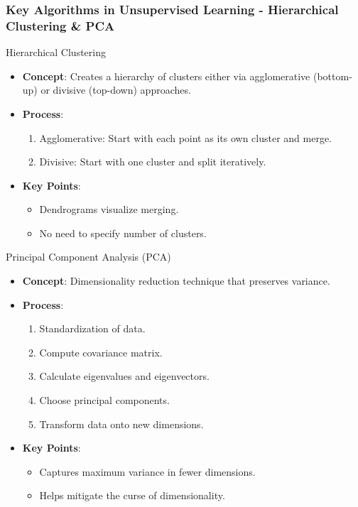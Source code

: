 \documentclass{beamer}
\begin{document}
\begin{frame}[fragile]
    \frametitle{Key Algorithms in Unsupervised Learning - Hierarchical Clustering \& PCA}
    \begin{block}{Hierarchical Clustering}
        \begin{itemize}
            \item \textbf{Concept}: Creates a hierarchy of clusters either via agglomerative (bottom-up) or divisive (top-down) approaches.
            \item \textbf{Process}:
                \begin{enumerate}
                    \item Agglomerative: Start with each point as its own cluster and merge.
                    \item Divisive: Start with one cluster and split iteratively.
                \end{enumerate}
            \item \textbf{Key Points}:
                \begin{itemize}
                    \item Dendrograms visualize merging.
                    \item No need to specify number of clusters.
                \end{itemize}
        \end{itemize}
    \end{block}

    \begin{block}{Principal Component Analysis (PCA)}
        \begin{itemize}
            \item \textbf{Concept}: Dimensionality reduction technique that preserves variance.
            \item \textbf{Process}:
                \begin{enumerate}
                    \item Standardization of data.
                    \item Compute covariance matrix.
                    \item Calculate eigenvalues and eigenvectors.
                    \item Choose principal components.
                    \item Transform data onto new dimensions.
                \end{enumerate}
            \item \textbf{Key Points}:
                \begin{itemize}
                    \item Captures maximum variance in fewer dimensions.
                    \item Helps mitigate the curse of dimensionality.
                \end{itemize}
        \end{itemize}
    \end{block}
\end{frame}
\end{document}

